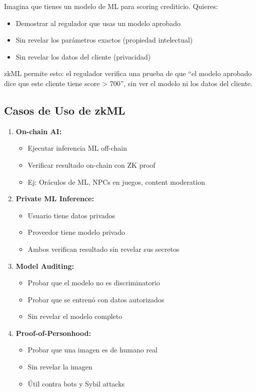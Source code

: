 \documentclass[11pt,a4paper,twoside]{book}
\begin{document}
\begin{intuicion}
Imagina que tienes un modelo de ML para scoring crediticio. Quieres:
\begin{itemize}
    \item Demostrar al regulador que usas un modelo aprobado
    \item Sin revelar los par\'ametros exactos (propiedad intelectual)
    \item Sin revelar los datos del cliente (privacidad)
\end{itemize}

zkML permite esto: el regulador verifica una prueba de que ``el modelo aprobado dice que este cliente tiene score > 700'', sin ver el modelo ni los datos del cliente.
\end{intuicion}

\subsection{Casos de Uso de zkML}

\begin{enumerate}
    \item \textbf{On-chain AI:}
    \begin{itemize}
        \item Ejecutar inferencia ML off-chain
        \item Verificar resultado on-chain con ZK proof
        \item Ej: Or\'aculos de ML, NPCs en juegos, content moderation
    \end{itemize}
    
    \item \textbf{Private ML Inference:}
    \begin{itemize}
        \item Usuario tiene datos privados
        \item Proveedor tiene modelo privado
        \item Ambos verifican resultado sin revelar sus secretos
    \end{itemize}
    
    \item \textbf{Model Auditing:}
    \begin{itemize}
        \item Probar que el modelo no es discriminatorio
        \item Probar que se entren\'o con datos autorizados
        \item Sin revelar el modelo completo
    \end{itemize}
    
    \item \textbf{Proof-of-Personhood:}
    \begin{itemize}
        \item Probar que una imagen es de humano real
        \item Sin revelar la imagen
        \item \'Util contra bots y Sybil attacks
    \end{itemize}
\end{enumerate}
\end{document}
